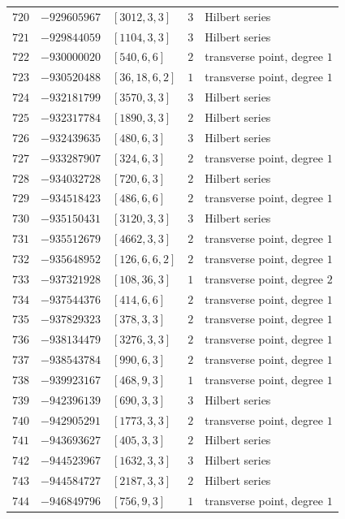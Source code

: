 \documentclass[11pt]{article}
\begin{document}
\begin{center}
\begin{longtable}{r r l c l}
$720$ & $-929605967$ & $[3012,3,3]$ & $3$ & Hilbert series\\
$721$ & $-929844059$ & $[1104,3,3]$ & $3$ & Hilbert series\\
$722$ & $-930000020$ & $[540,6,6]$ & $2$ & transverse point, degree $1$\\
$723$ & $-930520488$ & $[36,18,6,2]$ & $1$ & transverse point, degree $1$\\
$724$ & $-932181799$ & $[3570,3,3]$ & $3$ & Hilbert series\\
$725$ & $-932317784$ & $[1890,3,3]$ & $2$ & Hilbert series\\
$726$ & $-932439635$ & $[480,6,3]$ & $3$ & Hilbert series\\
$727$ & $-933287907$ & $[324,6,3]$ & $2$ & transverse point, degree $1$\\
$728$ & $-934032728$ & $[720,6,3]$ & $2$ & Hilbert series\\
$729$ & $-934518423$ & $[486,6,6]$ & $2$ & transverse point, degree $1$\\
$730$ & $-935150431$ & $[3120,3,3]$ & $3$ & Hilbert series\\
$731$ & $-935512679$ & $[4662,3,3]$ & $2$ & transverse point, degree $1$\\
$732$ & $-935648952$ & $[126,6,6,2]$ & $2$ & transverse point, degree $1$\\
$733$ & $-937321928$ & $[108,36,3]$ & $1$ & transverse point, degree $2$\\
$734$ & $-937544376$ & $[414,6,6]$ & $2$ & transverse point, degree $1$\\
$735$ & $-937829323$ & $[378,3,3]$ & $2$ & transverse point, degree $1$\\
$736$ & $-938134479$ & $[3276,3,3]$ & $2$ & transverse point, degree $1$\\
$737$ & $-938543784$ & $[990,6,3]$ & $2$ & transverse point, degree $1$\\
$738$ & $-939923167$ & $[468,9,3]$ & $1$ & transverse point, degree $1$\\
$739$ & $-942396139$ & $[690,3,3]$ & $3$ & Hilbert series\\
$740$ & $-942905291$ & $[1773,3,3]$ & $2$ & transverse point, degree $1$\\
$741$ & $-943693627$ & $[405,3,3]$ & $2$ & Hilbert series\\
$742$ & $-944523967$ & $[1632,3,3]$ & $3$ & Hilbert series\\
$743$ & $-944584727$ & $[2187,3,3]$ & $2$ & Hilbert series\\
$744$ & $-946849796$ & $[756,9,3]$ & $1$ & transverse point, degree $1$\\

\end{longtable}
\end{center}
\end{document}
